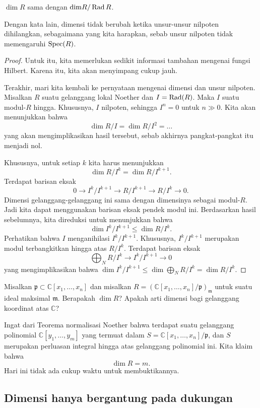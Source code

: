 \begin{proposition} 
$\dim R$ sama dengan $\mathrm{dim} R/\operatorname{Rad} R$.
\end{proposition} 
Dengan kata lain, dimensi tidak berubah ketika unsur-unsur nilpoten dihilangkan, sebagaimana
yang kita harapkan, sebab unsur nilpoten tidak memengaruhi $\operatorname{Spec} (R)$.
\begin{proof} 
Untuk itu, kita memerlukan sedikit informasi tambahan mengenai fungsi Hilbert.
Karena itu, kita akan menyimpang cukup jauh. 


Terakhir, mari kita kembali ke pernyataan mengenai dimensi dan unsur nilpoten. Misalkan $R$
suatu gelanggang lokal Noether dan $I = \operatorname{Rad} (R)$. Maka $I$ suatu modul-$R$ hingga. Khususnya,
$I$ nilpoten, sehingga $I^n  = 0$ untuk $n \gg 0$. Kita akan menunjukkan bahwa
\[ \dim R/I = \dim R/I^2 = \dots \]
yang akan mengimplikasikan hasil tersebut, sebab akhirnya pangkat-pangkat itu menjadi nol. 

Khususnya, untuk setiap $k$ kita harus menunjukkan 
\[ \dim R/I^k  = \dim R/I^{k+1}.  \]
Terdapat barisan eksak
\[ 0 \to I^k/I^{k+1} \to R/I^{k+1} \to R/I^k \to 0.  \]
Dimensi gelanggang-gelanggang ini sama dengan dimensinya sebagai
modul-$R$. Jadi kita dapat menggunakan barisan eksak pendek modul ini. Berdasarkan
hasil sebelumnya, kita direduksi untuk menunjukkan bahwa
\[ \dim I^k/I^{k+1} \leq \dim R/I^k.  \]
Perhatikan bahwa $I$ menganihilasi $I^k/I^{k+1}$. Khususnya, $I^k/I^{k+1}$ merupakan modul
terbangkitkan hingga atas $R/I^k$. Terdapat barisan eksak
\[ \bigoplus_N R/I^k \to I^k/I^{k+1} \to 0  \]
yang mengimplikasikan bahwa $\dim I^k/I^{k+1} \leq \dim \bigoplus_N R/I^k = \dim R/I^k$.
\end{proof} 

\begin{example} 
Misalkan $\mathfrak{p} \subset \mathbb{C}[x_1, \dots, x_n]$ dan misalkan $R =
(\mathbb{C}[x_1,\dots, x_n]/\mathfrak{p})_{\mathfrak{m}}$ untuk suatu ideal maksimal
$\mathfrak{m}$. Berapakah $\dim R$? 
Apakah arti dimensi bagi gelanggang koordinat atas $\mathbb{C}$?

Ingat dari Teorema normalisasi Noether bahwa terdapat suatu gelanggang polinomial
$\mathbb{C}[y_1, \dots, y_m]$ yang termuat dalam $S=\mathbb{C}[x_1,\dots,
x_n]/\mathfrak{p}$, dan $S$ merupakan perluasan integral hingga atas gelanggang polinomial ini. 
Kita klaim bahwa 
\[ \dim R = m.  \]
Hari ini tidak ada cukup waktu untuk membuktikannya. 
\end{example} 

\subsection{Dimensi hanya bergantung pada dukungan}

